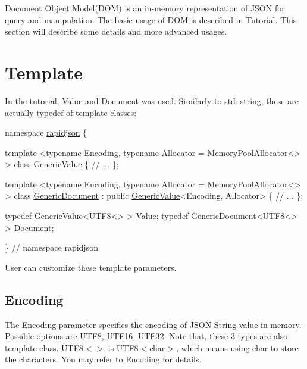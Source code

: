 Document Object Model(\+D\+O\+M) is an in-\/memory representation of J\+S\+ON for query and manipulation. The basic usage of D\+OM is described in Tutorial. This section will describe some details and more advanced usages.\hypertarget{md_Cadriciel_Commun_Externe_RapidJSON_doc_dom.zh-cn_Template}{}\section{Template}\label{md_Cadriciel_Commun_Externe_RapidJSON_doc_dom.zh-cn_Template}
In the tutorial, {\ttfamily Value} and {\ttfamily Document} was used. Similarly to {\ttfamily std\+::string}, these are actually {\ttfamily typedef} of template classes\+:


\begin{DoxyCode}
\textcolor{keyword}{namespace }\hyperlink{namespacerapidjson}{rapidjson} \{

\textcolor{keyword}{template} <\textcolor{keyword}{typename} Encoding, \textcolor{keyword}{typename} Allocator = MemoryPoolAllocator<> >
\textcolor{keyword}{class }\hyperlink{class_generic_value}{GenericValue} \{
    \textcolor{comment}{// ...}
\};

\textcolor{keyword}{template} <\textcolor{keyword}{typename} Encoding, \textcolor{keyword}{typename} Allocator = MemoryPoolAllocator<> >
\textcolor{keyword}{class }\hyperlink{class_generic_document}{GenericDocument} : \textcolor{keyword}{public} \hyperlink{class_generic_value}{GenericValue}<Encoding, Allocator> \{
    \textcolor{comment}{// ...}
\};

\textcolor{keyword}{typedef} \hyperlink{class_generic_value}{GenericValue<UTF8<>} > \hyperlink{document_8h_a071cf97155ba72ac9a1fc4ad7e63d481}{Value};
\textcolor{keyword}{typedef} GenericDocument<UTF8<> > \hyperlink{document_8h_ac6ea5b168e3fe8c7fa532450fc9391f7}{Document};

\} \textcolor{comment}{// namespace rapidjson}
\end{DoxyCode}


User can customize these template parameters.\hypertarget{md_Cadriciel_Commun_Externe_RapidJSON_doc_dom.zh-cn_Encoding}{}\subsection{Encoding}\label{md_Cadriciel_Commun_Externe_RapidJSON_doc_dom.zh-cn_Encoding}
The {\ttfamily Encoding} parameter specifies the encoding of J\+S\+ON String value in memory. Possible options are {\ttfamily \hyperlink{struct_u_t_f8}{U\+T\+F8}}, {\ttfamily \hyperlink{struct_u_t_f16}{U\+T\+F16}}, {\ttfamily \hyperlink{struct_u_t_f32}{U\+T\+F32}}. Note that, these 3 types are also template class. {\ttfamily \hyperlink{struct_u_t_f8}{U\+T\+F8}$<$$>$} is {\ttfamily \hyperlink{struct_u_t_f8}{U\+T\+F8}$<$char$>$}, which means using char to store the characters. You may refer to Encoding for details.

